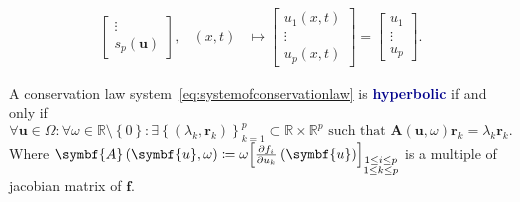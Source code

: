 \documentclass[
    8pt,
    aspectratio=1610,
    c,
    intlimits,
		handout,
    leqno,
    professionalfonts,
]{beamer}
\begin{document}
\begin{frame}
\begin{definition}
\begin{align*}
\begin{bmatrix}
				\vdots                      \\
				s_{p}\left(\symbf{u}\right)
			\end{bmatrix}, &
			\left(x,t\right)
			                               & \longmapsto
			\begin{bmatrix}
				u_{1}\left(x,t\right) \\
				\vdots                \\
				u_{p}\left(x,t\right)
			\end{bmatrix}=
			\begin{bmatrix}
				u_{1}  \\
				\vdots \\
				u_{p}
			\end{bmatrix}.
		\end{align*}
	\end{definition}

	\pause

	\begin{definition}
		A conservation law system~\eqref{eq:systemofconservationlaw} is
		\textcolor{DarkBlue}{\bfseries hyperbolic} if and only if
		\begin{equation}
			\forall\symbf{u}\in\Omega\!:
			\forall\omega\in\mathbb{R}\setminus\left\{0\right\}\!:
			\exists\left\{\left(\lambda_{k},\symbf{r}_{k}\right)\right\}^{p}_{k=1}\subset
			\mathbb{R}\times\mathbb{R}^{p}
			\text{ such that }
			\symbf{A}\left(\symbf{u},\omega\right)
			\symbf{r}_{k}=
			\lambda_{k}
			\symbf{r}_{k}.
		\end{equation}
		Where
		\begin{math}
			\symbf{A}\left(\symbf{u},\omega\right)\coloneqq
			\omega
			{
				\begin{bmatrix}
					\diffp{f_{i}}{u_{k}}
					\left(\symbf{u}\right)
				\end{bmatrix}}_{\substack{1\leq i\leq p\\1\leq k\leq p}}
		\end{math}
		is a multiple of jacobian matrix of $\mathbf{f}$.
	\end{definition}
\end{frame}
\end{document}
